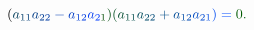 \documentclass[12pt]{article}
\begin{document}
\begin{displaymath}
{(} \mathcolor[RGB]{0,60,90}{a} _ { \mathcolor[RGB]{0,60,105}{1} \mathcolor[RGB]{0,60,120}{1} } \mathcolor[RGB]{0,60,135}{a} _ { \mathcolor[RGB]{0,60,150}{2} \mathcolor[RGB]{0,60,165}{2} } \mathcolor[RGB]{0,60,180}{-} \mathcolor[RGB]{0,60,195}{a} _ { \mathcolor[RGB]{0,60,210}{1} \mathcolor[RGB]{0,60,225}{2} } \mathcolor[RGB]{0,60,240}{a} _ { \mathcolor[RGB]{0,60,255}{2} \mathcolor[RGB]{0,75,0}{1} } \mathcolor[RGB]{0,75,15}{)} \mathcolor[RGB]{0,75,30}{(} \mathcolor[RGB]{0,75,45}{a} _ { \mathcolor[RGB]{0,75,60}{1} \mathcolor[RGB]{0,75,75}{1} } \mathcolor[RGB]{0,75,90}{a} _ { \mathcolor[RGB]{0,75,105}{2} \mathcolor[RGB]{0,75,120}{2} } \mathcolor[RGB]{0,75,135}{+} \mathcolor[RGB]{0,75,150}{a} _ { \mathcolor[RGB]{0,75,165}{1} \mathcolor[RGB]{0,75,180}{2} } \mathcolor[RGB]{0,75,195}{a} _ { \mathcolor[RGB]{0,75,210}{2} \mathcolor[RGB]{0,75,225}{1} } \mathcolor[RGB]{0,75,240}{)} \mathcolor[RGB]{0,75,255}{=} \mathcolor[RGB]{0,90,0}{0} \mathcolor[RGB]{0,90,15}{.}
\end{displaymath}
\end{document}
